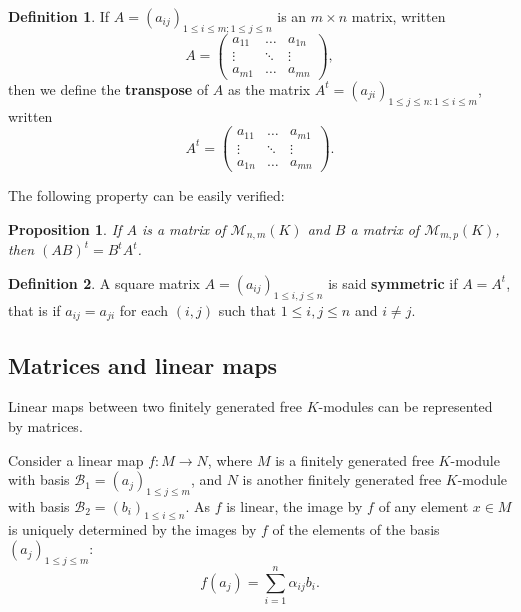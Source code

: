 \documentclass{report}
\newtheorem{prop}{Proposition}
\theoremstyle{definition}
\newtheorem{defin}{Definition}
\theoremstyle{remark}
\begin{document}
\begin{defin} If $A = (a_{ij})_{1\leq i \leq m; 1 \leq j \leq n}$ is an $m \times n$ matrix, written
        \begin{equation*}
                A = 
                \begin{pmatrix}
                        a_{11} & \dots & a_{1n} \\
                        \vdots & \ddots & \vdots \\
                        a_{m1} & \dots & a_{mn}
                \end{pmatrix},
        \end{equation*}
        then we define the \textbf{transpose} of $A$ as the matrix $A^t = (a_{ji})_{1 \leq j \leq n : 1 \leq i \leq m}$, written  
        \begin{equation*}
                A^t = 
                \begin{pmatrix}
                        a_{11} & \dots & a_{m1} \\
                        \vdots & \ddots & \vdots \\
                        a_{1n} & \dots & a_{mn}
                \end{pmatrix}
.        \end{equation*}
\end{defin}

\medskip
The following property can be easily verified:

\begin{prop} If $A$ is a matrix of $\mathcal{M}_{n , m}(K)$ and $B$ a matrix of $\mathcal{M}_{m , p}(K)$, then $(AB)^t=B^tA^t$.
        
\end{prop}
\medskip
\begin{defin}
A square matrix $A = (a_{ij})_{1\leq i,j \leq n}$ is said \textbf{symmetric} if $A=A^t$, that is if $a_{ij}=a_{ji}$ for each $(i,j)$ such that $1\leq i,j \leq n $ and $i\neq j$.
\end{defin}


\bigskip 
\subsection{Matrices and linear maps}
Linear maps between two finitely generated free $K$-modules can be represented by matrices.


\bigskip
Consider a linear map $f:M \to N$, where $M$ is a finitely generated free $K$-module with basis $\mathcal{B}_1=(a_j)_{1 \leq j \leq m}$, and $N$ is another finitely generated free $K$-module with basis $\mathcal{B}_2=(b_i)_{1 \leq i \leq n}$. As $f$ is linear, the image by $f$ of any element $x\in M$ is uniquely determined by the images by $f$ of the elements of the basis $(a_j)_{1 \leq j \leq m}$:
\begin{equation*}
    f(a_j) = \sum_{i = 1}^n \alpha_{ij}b_i.
\end{equation*}
\end{document}
